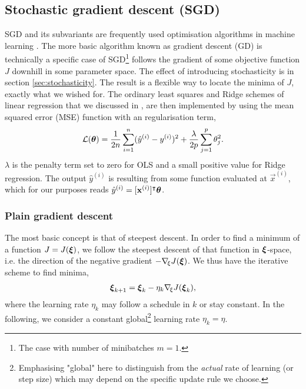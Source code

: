\subsection{Stochastic gradient descent (SGD)}\label{sec:stochastic_gradient_descent}
    SGD and its subvariants are frequently used optimisation algorithms in machine learning \citep{Goodfellow2016}. The more basic algorithm known as gradient descent (GD) is technically a specific case of SGD\footnote{The case with number of minibatches $m=1$.} follows the gradient of some objective function $J$ downhill in some parameter space. The effect of introducing stochasticity is  in section \ref{sec:stochasticity}. The result is a flexible way to locate the minima of  $J$, exactly what we wished for. The ordinary least squares and Ridge schemes of linear regression that we discussed in \projectOne, are then implemented by using the mean squared error (MSE) function with an \lnorm[2] regularisation term,
    \begin{equation}\label{eq:linear_regression_cost_function}
        \mathcal{L}(\boldsymbol{\theta}) = \frac{1}{2n} \sum_{i=1}^n (\hat{y}^{(i)}-y^{(i)})^2 + \frac{\lambda}{2p} \sum_{j=1}^{p} \theta_j^2. 
    \end{equation}
    $\lambda$ is the penalty term set to zero for OLS and a small positive value for Ridge regression. The output $\hat{y}^{(i)}$ is resulting from some function evaluated at $\vec{x}^{(i)}$, which for our purposes reads $\hat{y}^{(i)} = [\mathbf{x}^{(i)}]^\intercal \boldsymbol{\theta}$.

    \fillertext

 
    \subsubsection{Plain gradient descent}\label{sec:plain_gradient_descent}
        The most basic concept is that of steepest descent. In order to find a minimum of a function $J=J(\boldsymbol{\xi})$, we follow the steepest descent of that function in $\boldsymbol{\xi}$-space, i.e. the direction of the negative gradient $-\nabla_{\!\xi} J(\boldsymbol{\xi})$. We thus have the iterative scheme to find minima,
        \begin{align}\label{eq:steepest_descent}
            \boldsymbol{\xi}_{k+1} = \boldsymbol{\xi}_k - \eta_k\nabla_{\!\xi} J(\boldsymbol{\xi}_k),
        \end{align}
        where the learning rate $\eta_k$ may follow a schedule in $k$ or stay constant. In the following, we consider a constant global\footnote{Emphasising "global" here to distinguish from the \textit{actual} rate of learning (or step size) which may depend on the specific update rule we choose.} learning rate $\eta_k=\eta$.

